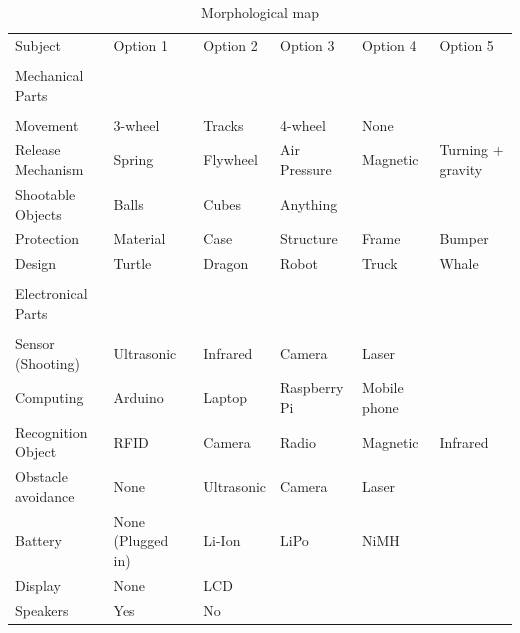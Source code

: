 \documentclass[11pt,twoside,a4paper]{report}
\begin{document}
\begin{table}[h]

\begin{tabular}{llllll}
Subject            & Option 1          & Option 2   & Option 3     & Option 4     & Option 5          \\
                   &                   &            &              &              &                   \\
Mechanical Parts   &                   &            &              &              &                   \\
                   &                   &            &              &              &                   \\
Movement           & 3-wheel           & Tracks     & 4-wheel      & None         &                   \\
Release Mechanism  & Spring            & Flywheel   & Air Pressure & Magnetic     & Turning + gravity \\
Shootable Objects  & Balls             & Cubes      & Anything     &              &                   \\
Protection         & Material          & Case       & Structure    & Frame        & Bumper            \\
Design             & Turtle            & Dragon     & Robot        & Truck        & Whale             \\
                   &                   &            &              &              &                   \\
Electronical Parts &                   &            &              &              &                   \\
                   &                   &            &              &              &                   \\
Sensor (Shooting)  & Ultrasonic        & Infrared   & Camera       & Laser        &                   \\
Computing          & Arduino           & Laptop     & Raspberry Pi & Mobile phone &                   \\
Recognition Object & RFID              & Camera     & Radio        & Magnetic     & Infrared          \\
Obstacle avoidance & None              & Ultrasonic & Camera       & Laser        &                   \\
Battery            & None (Plugged in) & Li-Ion     & LiPo         & NiMH         &                   \\
Display				& None & LCD & & & \\
Speakers 			& Yes & No & & & 
\end{tabular}

\caption{Morphological map}
\label{table:morphologicalmap}
\end{table}
\end{document}

